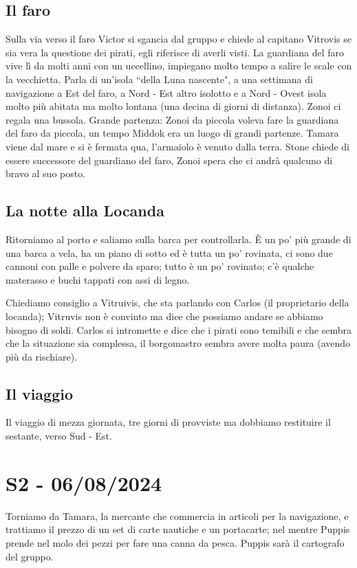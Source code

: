 \documentclass[letterpaper,twocolumn,openany, nodeprecatedcode, nomultitoc]{dndbook}
\begin{document}
\subsection{Il faro} Sulla via verso il faro Victor si sgancia dal gruppo e chiede al capitano Vitrovis se sia vera la questione dei pirati, egli riferisce di averli visti. La guardiana del faro vive lì da molti anni con un uccellino, impiegano molto tempo a salire le scale con la vecchietta. Parla di un'isola ``della Luna nascente", a una settimana di navigazione a Est del faro, a Nord - Est altro isolotto e a Nord - Ovest isola molto più abitata ma molto lontana (una decina di giorni di distanza). Zonoi ci regala una bussola. Grande partenza: Zonoi da piccola voleva fare la guardiana del faro da piccola, un tempo Middok era un luogo di grandi partenze. Tamara viene dal mare e si è fermata qua, l'armaiolo è venuto dalla terra. Stone chiede di essere successore del guardiano del faro, Zonoi spera che ci andrà qualcuno di bravo al suo posto.

\subsection{La notte alla Locanda}
Ritorniamo al porto e saliamo sulla barca per controllarla. È un po' più grande di una barca a vela, ha un piano di sotto ed è tutta un po' rovinata, ci sono due cannoni con palle e polvere da sparo; tutto è un po' rovinato; c'è qualche materasso e buchi tappati con assi di legno.

Chiediamo consiglio a Vitruivis, che sta parlando con Carlos (il proprietario della locanda); Vitruvis non è convinto ma dice che possiamo andare se abbiamo bisogno di soldi. Carlos si intromette e dice che i pirati sono temibili e che sembra che la situazione sia complessa, il borgomastro sembra avere molta paura (avendo più da rischiare).

\subsection{Il viaggio}
Il viaggio di mezza giornata, tre giorni di provviste ma dobbiamo restituire il sestante, verso Sud - Est.





\section{S2 - 06/08/2024}
Torniamo da Tamara, la mercante che commercia in articoli per la navigazione, e trattiamo il prezzo di un set di carte nautiche e un portacarte; nel mentre Puppis prende nel molo dei pezzi per fare una canna da pesca. Puppis sarà il cartografo del gruppo.
\end{document}
